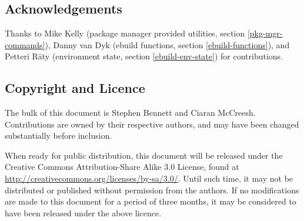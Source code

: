 \chapter*{}

\section*{Acknowledgements}

Thanks to Mike Kelly (package manager provided utilities, section \ref{pkg-mgr-commands}),
Danny van Dyk (ebuild functions, section \ref{ebuild-functions}), and
Petteri R\"aty (environment state, section \ref{ebuild-env-state}) for contributions.

\section*{Copyright and Licence}

The bulk of this document is  Stephen Bennett and Ciaran McCreesh. Contributions
are owned by their respective authors, and may have been changed substantially before inclusion.

When ready for public distribution, this document will be released under the Creative Commons
Attribution-Share Alike 3.0 License, found at \url{http://creativecommons.org/licenses/by-sa/3.0/}.
Until such time, it may not be distributed or published without permission from the authors. If no
modifications are made to this document for a period of three months, it may be considered to have
been released under the above licence.


